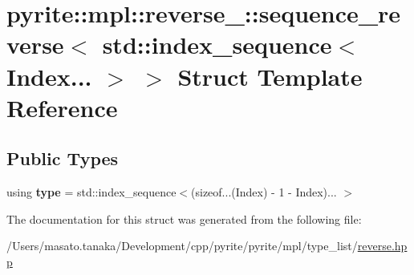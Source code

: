 \hypertarget{structpyrite_1_1mpl_1_1reverse___1_1sequence__reverse_3_01std_1_1index__sequence_3_01_index_8_8_8_01_4_01_4}{}\section{pyrite\+:\+:mpl\+:\+:reverse\+\_\+\+:\+:sequence\+\_\+reverse$<$ std\+:\+:index\+\_\+sequence$<$ Index... $>$ $>$ Struct Template Reference}
\label{structpyrite_1_1mpl_1_1reverse___1_1sequence__reverse_3_01std_1_1index__sequence_3_01_index_8_8_8_01_4_01_4}
\subsection*{Public Types}
\begin{DoxyCompactItemize}
\item 
\mbox{\label{structpyrite_1_1mpl_1_1reverse___1_1sequence__reverse_3_01std_1_1index__sequence_3_01_index_8_8_8_01_4_01_4_a6893882c77aad4f277cdc2f453811f50}} 
using {\bfseries type} = std\+::index\+\_\+sequence$<$(sizeof...(Index) -\/ 1 -\/ Index)... $>$
\end{DoxyCompactItemize}


The documentation for this struct was generated from the following file\+:\begin{DoxyCompactItemize}
\item 
/\+Users/masato.\+tanaka/\+Development/cpp/pyrite/pyrite/mpl/type\+\_\+list/\mbox{\hyperlink{reverse_8hpp}{reverse.\+hpp}}\end{DoxyCompactItemize}
